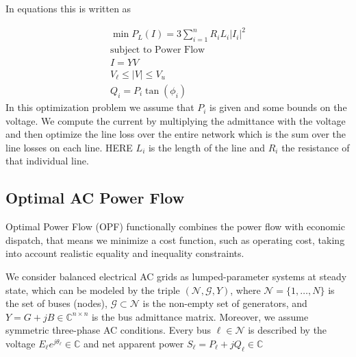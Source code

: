 In equations this is written as

\begin{align}
\min P_L(I)=3\sum_{i=1}^n R_iL_i|I_i|^2\\
\mbox{subject to } \mbox{Power Flow}\\
I=YV\\
V_{\ell}\leq |V|\leq V_u\\
Q_i=P_i\tan(\phi_i)
\end{align}
In this optimization problem we assume that $P_i$ is given and some bounds on the voltage. We compute the current by multiplying the admittance with the voltage and then optimize the line loss over the entire network which is the sum over the line losses on each line. HERE $L_i$ is the length of the line and $R_i$ the resistance of that individual line. 


\subsection{Optimal AC Power Flow}

Optimal Power Flow (OPF) functionally combines the power flow with economic dispatch, that means we minimize a cost function, such as operating cost, taking into account realistic equality and inequality constraints. 

We consider balanced electrical AC grids as lumped-parameter systems at steady state, which can be modeled by the triple 
$(\mathcal{N},\mathcal{G},Y)$, where 
$\mathcal{N}=\{1,\dots,N\}$
 is the set of buses (nodes), 
$\mathcal{G}\subset \mathcal{N}$ is the non-empty set of generators, and $Y=G+jB\in\mathbb{C}^{n\times n}$
 is the bus admittance matrix. Moreover, we assume symmetric three-phase AC conditions. Every bus $\ell\in\mathcal{N}$ is described by the voltage $E_{\ell}e^{j\theta_{\ell}}\in\mathbb{C}$ and net apparent power $S_{\ell}=P_{\ell}+jQ_{\ell}\in \mathbb{C}$



